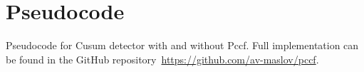 \newpage
\appendix
\section{Pseudocode}\label{sec:pseudo_code}
Pseudocode for Cusum detector with and without Pccf.
Full implementation can be found in the GitHub repository~\href{https://github.com/av-maslov/pccf}{https://github.com/av-maslov/pccf}.


%
%
%
%
%
%

